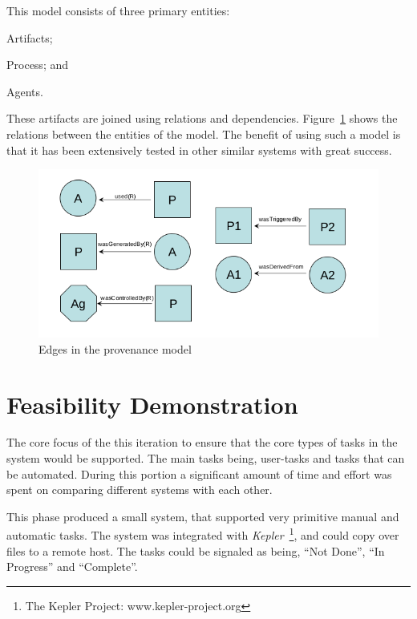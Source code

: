\documentclass[12pt,a4paper]{report}
\begin{document}
\begin{description}
        This model consists of three primary entities: \begin{inparaenum}[(i)]
        \item Artifacts; \item Process; and \item Agents.\end{inparaenum} These
        artifacts are joined using relations and dependencies.
        Figure~\ref{provenance}  shows the relations between the entities of
        the model. The benefit of using such a model is that it has been
        extensively tested in other similar systems with great success.
        \begin{figure}[!hb]
            \begin{center}
                \includegraphics[scale=0.5]{figures/provenance_edges.png}
            \end{center}
            \caption{Edges in the provenance model}
            \label{provenance}
        \end{figure}
\end{description}

\section{Feasibility Demonstration\label{feasibility}}

The core focus of the this iteration to ensure that the core types of tasks
in the system would be supported. The main tasks being, user-tasks and tasks
that can be automated. During this portion a significant amount of time and
effort was spent on comparing different systems with each other.

This phase produced a small system, that supported very primitive manual and automatic
tasks. The system was integrated with \emph{Kepler}~\footnote{
The Kepler Project: www.kepler-project.org }, and could copy over files to a remote
host. The tasks could be signaled as being, ``Not Done'', ``In Progress'' and ``Complete''.
\end{document}
